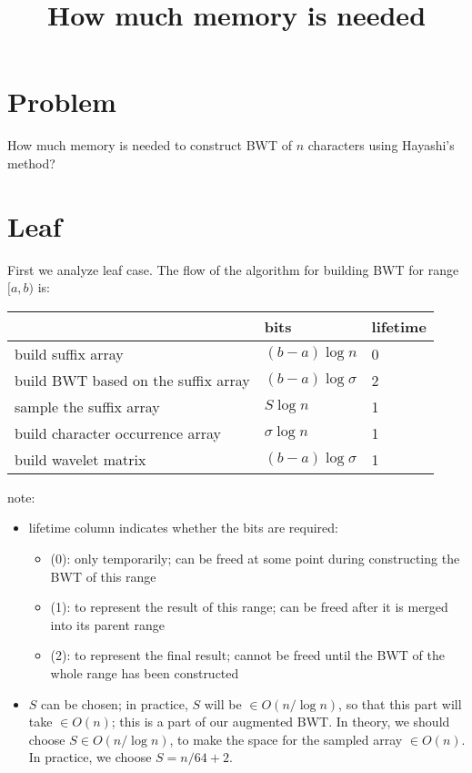 \documentclass[12pt,dvipdfmx]{article}
\title{How much memory is needed}
\author{}
\date{}
\begin{document}
\maketitle

\section{Problem}
How much memory is needed to construct BWT of
$n$ characters using Hayashi's method?

\section{Leaf}
First we analyze leaf case.  
The flow of the algorithm for building BWT for range $[a,b)$ is:


\begin{center}
\begin{tabular}{|p{8cm}|l|l|}\hline
                                    & bits                  & lifetime \\\hline
build suffix array                  & $(b - a) \log n$      & 0 \\
build BWT based on the suffix array & $(b - a) \log \sigma$ & 2 \\
sample the suffix array             & $S \log n$            & 1 \\
build character occurrence array    & $\sigma \log n$       & 1 \\
build wavelet matrix                & $(b - a) \log \sigma$ & 1 \\\hline
\end{tabular}
\end{center}

note:
\begin{itemize}
\item lifetime column indicates whether
  the bits are required:
  \begin{itemize}
  \item (0): only temporarily; can be freed at some point 
    during constructing the BWT of this range
  \item (1): to represent the result of this range; can be
    freed after it is merged into its parent range
  \item (2): to represent the final result; cannot be
    freed until the BWT of the whole range has been constructed
  \end{itemize}

\item $S$ can be chosen; 
  in practice, $S$ will be $\in O(n / \log n)$,
  so that this part will take $\in O(n)$;
  this is a part of our augmented BWT.
  In theory, we should choose $S \in O(n / \log n)$, 
  to make the space for the sampled array $\in O(n)$.
  In practice, we choose $S = n / 64 + 2$.
\end{itemize}
\end{document}
